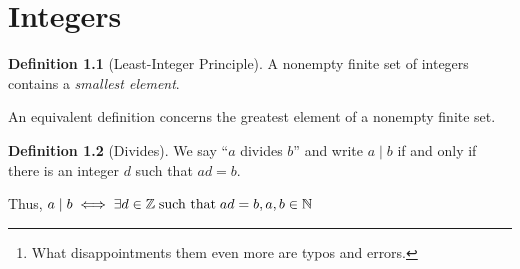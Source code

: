 \documentclass[english,notitlepage,smartquotes]{hgbreport}
\theoremstyle{definition}
\newtheorem{definition}{Definition}
\theoremstyle{remark}
\theoremstyle{plain}
\begin{document}
\begin{abstract}
Readable and flawless mathematical typesetting is hard. It's ironic that the epitome of exact sciences breeds a degree of inexactness in notation. Like in literature, meaning sometimes depends on context not captured in notation. And yet, an encyclopedic treatment of notation at the beginning of a work like this tends to bore readers\footnote{What disappointments them even more are typos and errors.}. Here too, a balance needs to be sought. A few conventions are therefore in order:
\begin{itemize}
\item A roman letter in italics, like, for example, $p$, denotes an integer, unless specified otherwise.
\item The so-called \verb|\cdot|: $\cdot$ to denote multiplication is sometimes omitted. Thus, $ab$ is equivalent (and often even preferred and ubiquitous, thanks to Euler!) to $a\cdot b$.

\end{itemize}
\end{abstract}

\tableofcontents

\chapter{Integers}


\begin{definition}[Least-Integer Principle]
\label{def:leastinp}
A nonempty finite set of integers contains a \emph{smallest element}.
\end{definition}
An equivalent definition concerns the greatest element of a nonempty finite set.
\begin{definition}[Divides]
\label{def:divides}
We say ``$a$ divides $b$'' and write $a\mid b$ if and only if there is an integer $d$ such that $ad=b$.

Thus, $a\mid b \iff \exists d\in \mathbb{Z} \text{\;such that\;} ad=b,  a, b\in \mathbb{N}$
\end{definition}
\end{document}
